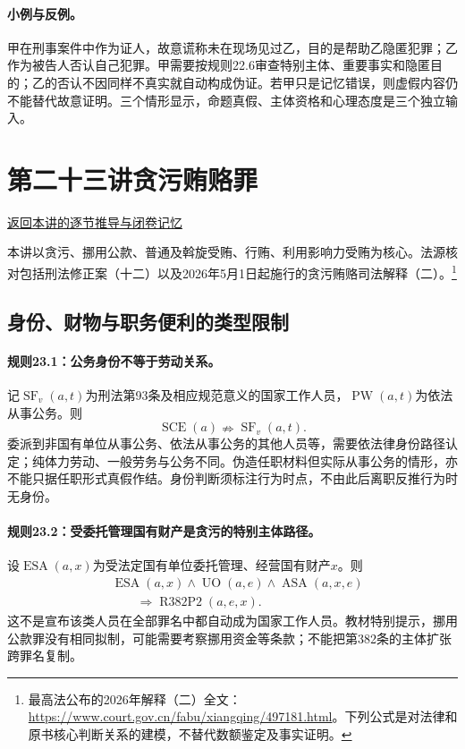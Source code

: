 \paragraph{小例与反例。}
甲在刑事案件中作为证人，故意谎称未在现场见过乙，目的是帮助乙隐匿犯罪；乙作为被告人否认自己犯罪。甲需要按规则22.6审查特别主体、重要事实和隐匿目的；乙的否认不因同样不真实就自动构成伪证。若甲只是记忆错误，则虚假内容仍不能替代故意证明。三个情形显示，命题真假、主体资格和心理态度是三个独立输入。

\section{第二十三讲\quad 贪污贿赂罪}

\label{ref:lecture:23}

\noindent\hyperref[lecture:23]{返回本讲的逐节推导与闭卷记忆}

本讲以贪污、挪用公款、普通及斡旋受贿、行贿、利用影响力受贿为核心。法源核对包括刑法修正案（十二）以及2026年5月1日起施行的贪污贿赂司法解释（二）。\footnote{最高法公布的2026年解释（二）全文：\url{https://www.court.gov.cn/fabu/xiangqing/497181.html}。下列公式是对法律和原书核心判断关系的建模，不替代数额鉴定及事实证明。}

\subsection{身份、财物与职务便利的类型限制}
\paragraph{规则23.1：公务身份不等于劳动关系。}
记$\operatorname{SF}_v(a,t)$为刑法第93条及相应规范意义的国家工作人员，$\operatorname{PW}(a,t)$为依法从事公务。则
\[
\operatorname{SCE}(a)
\nRightarrow\operatorname{SF}_v(a,t).
\]
委派到非国有单位从事公务、依法从事公务的其他人员等，需要依法律身份路径认定；纯体力劳动、一般劳务与公务不同。伪造任职材料但实际从事公务的情形，亦不能只据任职形式真假作结。身份判断须标注行为时点，不由此后离职反推行为时无身份。

\paragraph{规则23.2：受委托管理国有财产是贪污的特别主体路径。}
设$\operatorname{ESA}(a,x)$为受法定国有单位委托管理、经营国有财产$x$。则
\[
\begin{aligned}
&\operatorname{ESA}(a,x)\land\operatorname{UO}(a,e)
\land\operatorname{ASA}(a,x,e)\\
&\qquad\Rightarrow\operatorname{R382P2}(a,e,x).
\end{aligned}
\]
这不是宣布该类人员在全部罪名中都自动成为国家工作人员。教材特别提示，挪用公款罪没有相同拟制，可能需要考察挪用资金等条款；不能把第382条的主体扩张跨罪名复制。

